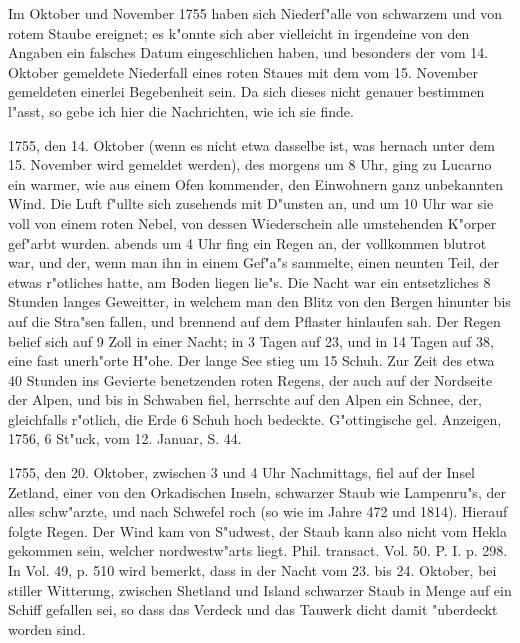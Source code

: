 \documentclass[a4paper, 11pt, oneside, polutonikogreek, german]{article}
\begin{document}
Im Oktober und November 1755 haben sich Niederf"alle von schwarzem und von rotem Staube ereignet; es k"onnte sich aber vielleicht in irgendeine von den Angaben ein falsches Datum eingeschlichen haben, und besonders der vom 14. Oktober gemeldete Niederfall eines roten Staues mit dem vom 15. November gemeldeten einerlei Begebenheit sein. Da sich dieses nicht genauer bestimmen l"asst, so gebe ich hier die Nachrichten, wie ich sie finde.

1755, den 14. Oktober (wenn es nicht etwa dasselbe ist, was hernach unter dem 15. November wird gemeldet werden), des morgens um 8 Uhr, ging zu Lucarno ein warmer, wie aus einem Ofen kommender, den Einwohnern ganz unbekannten Wind. Die Luft f"ullte sich zusehends mit D"unsten an, und um 10 Uhr war sie voll von einem roten Nebel, von dessen Wiederschein alle umstehenden K"orper gef"arbt wurden. abends um 4 Uhr fing ein Regen an, der vollkommen blutrot war, und der, wenn man ihn in einem Gef"a"s sammelte, einen neunten Teil, der etwas r"otliches hatte, am Boden liegen lie"s. Die Nacht war ein entsetzliches 8 Stunden langes Geweitter, in welchem man den Blitz von den Bergen hinunter bis auf die Stra"sen fallen, und brennend auf dem Pflaster hinlaufen sah. Der Regen belief sich auf 9 Zoll in einer Nacht; in 3 Tagen auf 23, und in 14 Tagen auf 38, eine fast unerh"orte H"ohe. Der lange See stieg um 15 Schuh. Zur Zeit des etwa 40 Stunden ins Gevierte benetzenden roten Regens, der auch auf der Nordseite der Alpen, und bis in Schwaben fiel, herrschte auf den Alpen ein Schnee, der, gleichfalls r"otlich, die Erde 6 Schuh hoch bedeckte. G"ottingische gel. Anzeigen, 1756, 6 St"uck, vom 12. Januar, S. 44.

1755, den 20. Oktober, zwischen 3 und 4 Uhr Nachmittags, fiel auf der Insel Zetland, einer von den Orkadischen Inseln, schwarzer Staub wie Lampenru"s, der alles schw"arzte, und nach Schwefel roch (so wie im Jahre 472 und 1814). Hierauf folgte Regen. Der Wind kam von S"udwest, der Staub kann also nicht vom Hekla gekommen sein, welcher nordwestw"arts liegt. Phil. transact. Vol. 50. P. I. p. 298. In Vol. 49, p. 510 wird bemerkt, dass in der Nacht vom 23. bis 24. Oktober, bei stiller Witterung, zwischen Shetland und Island schwarzer Staub in Menge auf ein Schiff gefallen sei, so dass das Verdeck und das Tauwerk dicht damit "uberdeckt worden sind.
\end{document}
